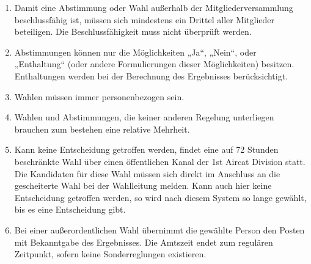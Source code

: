 \begin{enumerate}[label=(\arabic*)]
    \item Damit eine Abstimmung oder Wahl außerhalb der Mitgliederversammlung beschlussfähig ist, müssen sich mindestens ein Drittel aller Mitglieder beteiligen. Die Beschlussfähigkeit muss nicht überprüft werden.
    \item Abstimmungen können nur die Möglichkeiten „Ja“, „Nein“, oder „Enthaltung“ (oder andere Formulierungen dieser Möglichkeiten) besitzen. Enthaltungen werden bei der Berechnung des Ergebnisses berücksichtigt.
    \item Wahlen müssen immer personenbezogen sein.
    \item Wahlen und Abstimmungen, die keiner anderen Regelung unterliegen brauchen zum bestehen eine relative Mehrheit.
    \item Kann keine Entscheidung getroffen werden, findet eine auf 72 Stunden beschränkte Wahl über einen öffentlichen Kanal der 1st Aircat Division statt. Die Kandidaten für diese Wahl müssen sich direkt im Anschluss an die gescheiterte Wahl bei der Wahlleitung melden. Kann auch hier keine Entscheidung getroffen werden, so wird nach diesem System so lange gewählt, bis es eine Entscheidung gibt.
    \item Bei einer außerordentlichen Wahl übernimmt die gewählte Person den Posten mit Bekanntgabe des Ergebnisses. Die Amtszeit endet zum regulären Zeitpunkt, sofern keine Sonderreglungen existieren.
\end{enumerate}